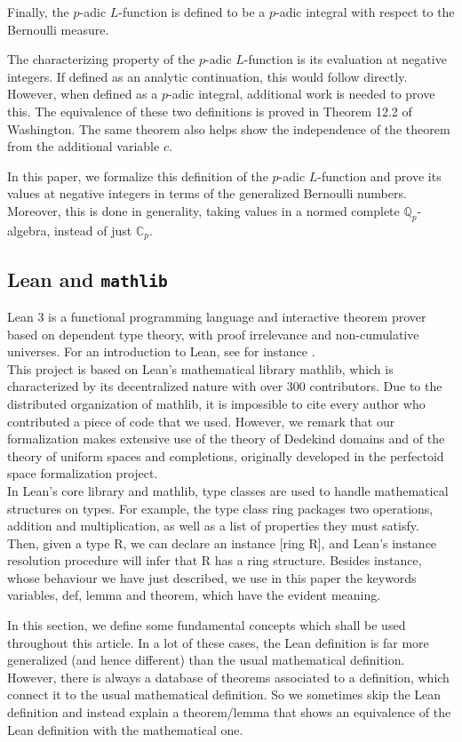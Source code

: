\documentclass[11pt]{article}
\newcommand{\lean}[1]{\texttt{#1}\xspace} %
\begin{document}
Finally, the $p$-adic $L$-function is defined to be a $p$-adic integral with respect to the Bernoulli 
measure. 

The characterizing property of the $p$-adic $L$-function is its evaluation at negative integers. If defined as an 
analytic continuation, this would follow directly. However, when defined as a $p$-adic integral, additional work is 
needed to prove this. The equivalence of these two definitions is proved in Theorem 12.2 of Washington. The same theorem 
also helps show the independence of the theorem from the additional variable $c$.

In this paper, we formalize this definition of the $p$-adic $L$-function and prove its values at negative integers in terms of 
the generalized Bernoulli numbers. Moreover, this is done in generality, taking values in a normed complete $\mathbb{Q}_p$-algebra, 
instead of just $\mathbb{C}_p$.
\subsection{Lean and \lean{mathlib}}
Lean 3 is a functional programming language and interactive theorem prover based on
dependent type theory, with proof irrelevance and non-cumulative universes. For an
introduction to Lean, see for instance . \\

This project is based on Lean’s mathematical library mathlib, which is characterized by
its decentralized nature with over 300 contributors. Due to the distributed organization of
mathlib, it is impossible to cite every author who contributed a piece of code that we used.
However, we remark that our formalization makes extensive use of the theory of Dedekind
domains and of the theory of uniform spaces and completions, originally developed in the
perfectoid space formalization project. \\

In Lean’s core library and mathlib, type classes are used to handle mathematical
structures on types. For example, the type class ring packages two operations, addition and
multiplication, as well as a list of properties they must satisfy. Then, given a type R, we can
declare an instance [ring R], and Lean’s instance resolution procedure will infer that R has
a ring structure. Besides instance, whose behaviour we have just described, we use in this
paper the keywords variables, def, lemma and theorem, which have the evident meaning.

In this section, we define some fundamental concepts which shall be used throughout this article. In a lot of these cases, 
the Lean definition is far more generalized (and hence different) than the usual mathematical definition. However, there is 
always a database of theorems associated to a definition, which connect it to the usual mathematical definition. So 
we sometimes skip the Lean definition and instead explain a theorem/lemma that shows an equivalence of the Lean definition with the mathematical one. \\
\end{document}
